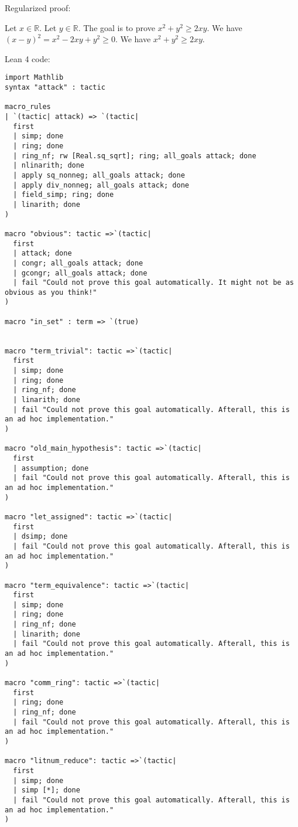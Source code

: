 \documentclass{article}
\begin{document}
Regularized proof:
\begin{tcolorbox}[colback=red!10, width=\linewidth]
Let $x\in\mathbb{R}$.
Let $y\in\mathbb{R}$.
The goal is to prove $x^2 + y^2 \ge 2xy$.
We have ${{(x-y)}}^2 = x^2 -2xy + y^2 \ge 0$.
We have $x^2 + y^2 \ge 2xy$.
\end{tcolorbox}

Lean 4 code:
\begin{tcolorbox}[colback=white!10, width=\linewidth]
\begin{lstlisting}[language=Lean4]
import Mathlib
syntax "attack" : tactic

macro_rules
| `(tactic| attack) => `(tactic|
  first
  | simp; done
  | ring; done
  | ring_nf; rw [Real.sq_sqrt]; ring; all_goals attack; done
  | nlinarith; done
  | apply sq_nonneg; all_goals attack; done
  | apply div_nonneg; all_goals attack; done
  | field_simp; ring; done
  | linarith; done
)

macro "obvious": tactic =>`(tactic|
  first
  | attack; done
  | congr; all_goals attack; done
  | gcongr; all_goals attack; done
  | fail "Could not prove this goal automatically. It might not be as obvious as you think!"
)

macro "in_set" : term => `(true)


macro "term_trivial": tactic =>`(tactic|
  first
  | simp; done
  | ring; done
  | ring_nf; done
  | linarith; done
  | fail "Could not prove this goal automatically. Afterall, this is an ad hoc implementation."
)

macro "old_main_hypothesis": tactic =>`(tactic|
  first
  | assumption; done
  | fail "Could not prove this goal automatically. Afterall, this is an ad hoc implementation."
)

macro "let_assigned": tactic =>`(tactic|
  first
  | dsimp; done
  | fail "Could not prove this goal automatically. Afterall, this is an ad hoc implementation."
)

macro "term_equivalence": tactic =>`(tactic|
  first
  | simp; done
  | ring; done
  | ring_nf; done
  | linarith; done
  | fail "Could not prove this goal automatically. Afterall, this is an ad hoc implementation."
)

macro "comm_ring": tactic =>`(tactic|
  first
  | ring; done
  | ring_nf; done
  | fail "Could not prove this goal automatically. Afterall, this is an ad hoc implementation."
)

macro "litnum_reduce": tactic =>`(tactic|
  first
  | simp; done
  | simp [*]; done
  | fail "Could not prove this goal automatically. Afterall, this is an ad hoc implementation."
)


\end{lstlisting}
\end{tcolorbox}
\end{document}
